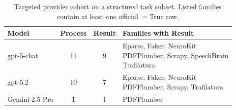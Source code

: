 \begin{table}[t]
\caption{Targeted provider cohort on a structured task subset. Listed families contain at least one official \resultmetric$=$True row.}
\label{tab:provider-screen}
\centering
\small
\setlength{\tabcolsep}{3.5pt}
\begin{tabular}{@{}p{}ccp{}@{}}
\toprule
\rowcolor{cyan!12}
Model & Process & Result & Families with Result \\
\midrule
\rowcolors{2}{cyan!4}{white}
gpt-5-chat & 11 & 9 & \shortstack[l]{Eparse, Faker, NeuroKit\\ PDFPlumber, Scrapy, SpeechBrain\\ Trafilatura} \\
gpt-5.2 & 10 & 7 & \shortstack[l]{Eparse, Faker, NeuroKit\\ PDFPlumber, Scrapy, Trafilatura} \\
Gemini-2.5-Pro & 1 & 1 & PDFPlumber \\
\bottomrule
\end{tabular}
\setlength{\tabcolsep}{6pt}
\end{table}
